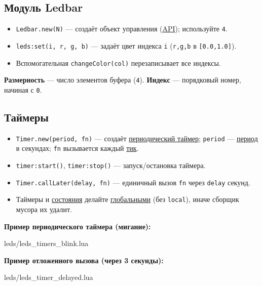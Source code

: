 \subsection{Модуль Ledbar}
\begin{itemize}
  \item \verb|Ledbar.new(N)| — создаёт объект управления (\hyperlink{term:api}{API}); используйте \verb|4|.
  \item \verb|leds:set(i, r, g, b)| — задаёт цвет индекса \verb|i| (\verb|r,g,b| в \verb|[0.0,1.0]|).
  \item Вспомогательная \verb|changeColor(col)| перезаписывает все индексы.
\end{itemize}
\textbf{Размерность} — число элементов буфера (\verb|4|). \textbf{Индекс} — порядковый номер, начиная с \verb|0|.

\subsection{Таймеры}
\begin{itemize}
  \item \verb|Timer.new(period, fn)| — создаёт \hyperlink{term:timer}{периодический таймер}; \verb|period| — \hyperlink{term:period}{период} в секундах; \verb|fn| вызывается каждый \hyperlink{term:tick}{тик}.
  \item \verb|timer:start()|, \verb|timer:stop()| — запуск/остановка таймера.
  \item \verb|Timer.callLater(delay, fn)| — единичный вызов \verb|fn| через \verb|delay| секунд.
  \item Таймеры и \hyperlink{term:state}{состояния} делайте \hyperlink{term:scope}{глобальными} (без \verb|local|), иначе сборщик мусора их удалит.
\end{itemize}
\textbf{Пример периодического таймера (мигание):}
\begin{codefile}{leds/leds_timers_blink.lua}
\end{codefile}
\textbf{Пример отложенного вызова (через 3 секунды):}
\begin{codefile}{leds/leds_timer_delayed.lua}
\end{codefile}


